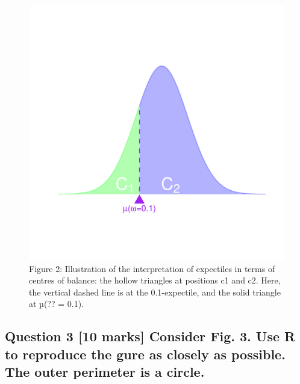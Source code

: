 \documentclass[]{article}
\begin{document}
\begin{figure}
\centering
\includegraphics{Assignment3_files/figure-latex/unnamed-chunk-3-1.pdf}
\caption{Figure 2: Illustration of the interpretation of expectiles in
terms of centres of balance: the hollow triangles at positions c1 and
c2. Here, the vertical dashed line is at the 0.1-expectile, and the
solid triangle at µ(?? = 0.1).}
\end{figure}

\subsection{Question 3 {[}10 marks{]} Consider Fig. 3. Use R to
reproduce the gure as closely as possible. The outer perimeter is a
circle.}\label{question-3-10-marks-consider-fig.-3.-use-r-to-reproduce-the-gure-as-closely-as-possible.-the-outer-perimeter-is-a-circle.}
\end{document}
